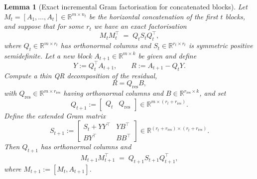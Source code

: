 \documentclass[10pt,a4paper]{amsart}
\newtheorem{lemma}{Lemma}
\begin{document}
\begin{lemma}[Exact incremental Gram factorisation for concatenated blocks]
\label{lem:incremental-gram}
Let $M_t = [A_1,\dots,A_t] \in \mathbb{R}^{m\times n_t}$ be the horizontal
concatenation of the first $t$ blocks, and suppose that for some $r_t$ we
have an exact factorisation
\[
  M_t M_t^\top \;=\; Q_t S_t Q_t^\top,
\]
where $Q_t \in \mathbb{R}^{m\times r_t}$ has orthonormal columns and
$S_t \in \mathbb{R}^{r_t\times r_t}$ is symmetric positive semidefinite.
Let a new block $A_{t+1}\in\mathbb{R}^{m\times k}$ be given and define
\[
  Y := Q_t^\top A_{t+1}, \qquad
  R := A_{t+1} - Q_t Y.
\]
Compute a thin QR decomposition of the residual,
\[
  R = Q_{\mathrm{res}} B,
\]
with $Q_{\mathrm{res}}\in\mathbb{R}^{m\times r_{\mathrm{res}}}$ having
orthonormal columns and $B\in\mathbb{R}^{r_{\mathrm{res}}\times k}$, and set
\[
  Q_{t+1} :=
  \begin{bmatrix}
    Q_t & Q_{\mathrm{res}}
  \end{bmatrix}
  \in\mathbb{R}^{m\times (r_t + r_{\mathrm{res}})}.
\]
Define the extended Gram matrix
\[
  S_{t+1} :=
  \begin{bmatrix}
    S_t + Y Y^\top & Y B^\top\\[0.3em]
    B Y^\top       & B B^\top
  \end{bmatrix}
  \in\mathbb{R}^{(r_t + r_{\mathrm{res}})\times (r_t + r_{\mathrm{res}})}.
\]
Then $Q_{t+1}$ has orthonormal columns and
\[
  M_{t+1} M_{t+1}^\top
  \;=\;
  Q_{t+1} S_{t+1} Q_{t+1}^\top,
\]
where $M_{t+1} := [M_t, A_{t+1}]$.
\end{lemma}
\end{document}
